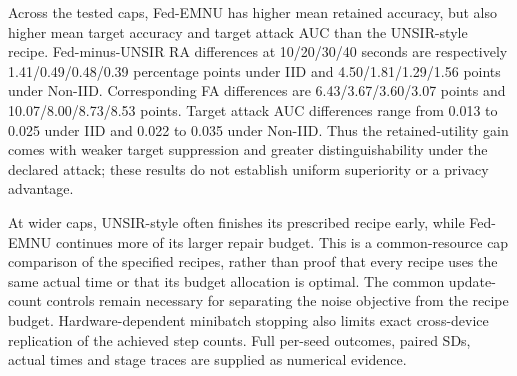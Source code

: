 Across the tested caps, Fed-EMNU has higher mean retained accuracy, but also
higher mean target accuracy and target attack AUC than the UNSIR-style recipe.
Fed-minus-UNSIR RA differences at 10/20/30/40 seconds are respectively
1.41/0.49/0.48/0.39 percentage points under IID and
4.50/1.81/1.29/1.56 points under Non-IID. Corresponding FA differences are
6.43/3.67/3.60/3.07 points and 10.07/8.00/8.73/8.53 points.
Target attack AUC differences range from 0.013 to 0.025 under IID and
0.022 to 0.035 under Non-IID. Thus the retained-utility gain comes with weaker
target suppression and greater distinguishability under the declared attack;
these results do not establish uniform superiority or a privacy advantage.

At wider caps, UNSIR-style often finishes its prescribed recipe early, while
Fed-EMNU continues more of its larger repair budget. This is a common-resource
cap comparison of the specified recipes, rather than proof that every recipe
uses the same actual time or that its budget allocation is optimal. The common
update-count controls remain necessary for separating the noise objective from
the recipe budget. Hardware-dependent minibatch stopping also limits exact
cross-device replication of the achieved step counts. Full per-seed outcomes,
paired SDs, actual times and stage traces are supplied as numerical evidence.
